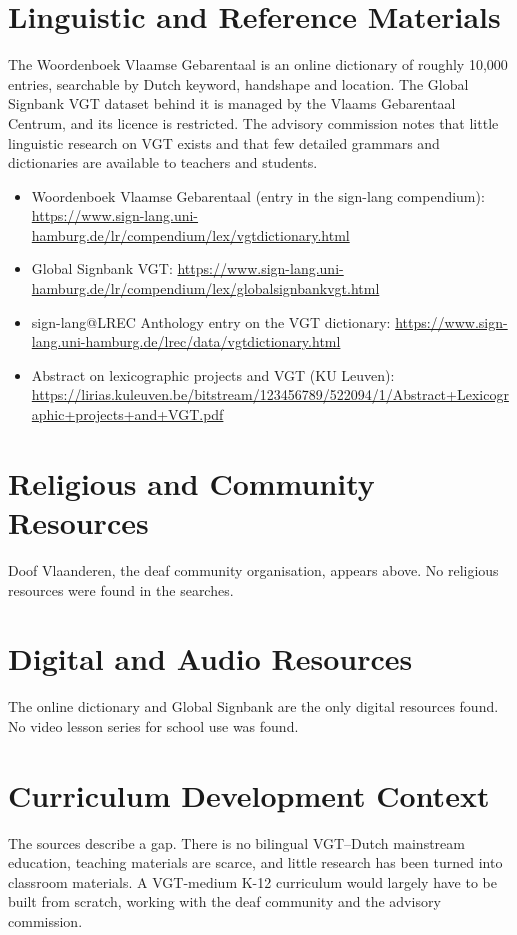\documentclass[12pt]{article}
\begin{document}
\section{Linguistic and Reference Materials}
The Woordenboek Vlaamse Gebarentaal is an online dictionary of roughly 10,000 entries, searchable by Dutch keyword, handshape and location. The Global Signbank VGT dataset behind it is managed by the Vlaams Gebarentaal Centrum, and its licence is restricted. The advisory commission notes that little linguistic research on VGT exists and that few detailed grammars and dictionaries are available to teachers and students.
\begin{itemize}
\item Woordenboek Vlaamse Gebarentaal (entry in the sign-lang compendium): \url{https://www.sign-lang.uni-hamburg.de/lr/compendium/lex/vgtdictionary.html}
\item Global Signbank VGT: \url{https://www.sign-lang.uni-hamburg.de/lr/compendium/lex/globalsignbankvgt.html}
\item sign-lang@LREC Anthology entry on the VGT dictionary: \url{https://www.sign-lang.uni-hamburg.de/lrec/data/vgtdictionary.html}
\item Abstract on lexicographic projects and VGT (KU Leuven): \url{https://lirias.kuleuven.be/bitstream/123456789/522094/1/Abstract+Lexicographic+projects+and+VGT.pdf}
\end{itemize}

\section{Religious and Community Resources}
Doof Vlaanderen, the deaf community organisation, appears above. No religious resources were found in the searches.

\section{Digital and Audio Resources}
The online dictionary and Global Signbank are the only digital resources found. No video lesson series for school use was found.

\section{Curriculum Development Context}
The sources describe a gap. There is no bilingual VGT--Dutch mainstream education, teaching materials are scarce, and little research has been turned into classroom materials. A VGT-medium K-12 curriculum would largely have to be built from scratch, working with the deaf community and the advisory commission.
\end{document}
